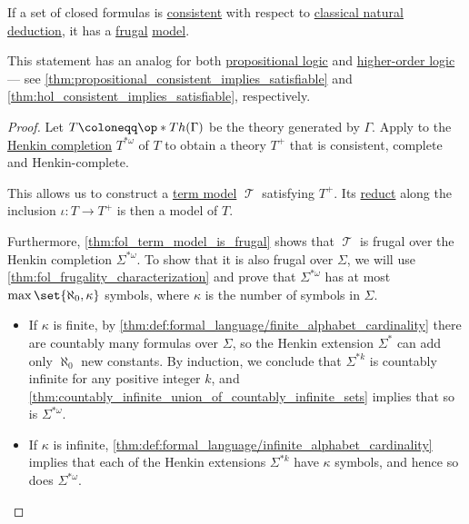 \begin{corollary}\label{thm:fol_consistent_implies_satisfiable}
  If a set of closed formulas is \hyperref[def:fol_theory/consistent]{consistent} with respect to \hyperref[def:fol_natural_deduction_system]{classical natural deduction}, it has a \hyperref[def:fol_frugal_structure]{frugal} \hyperref[def:fol_semantics/model]{model}.
\end{corollary}
\begin{comments}
  \item This statement has an analog for both \hyperref[def:propositional_logic]{propositional logic} and \hyperref[def:higher_order_logic]{higher-order logic} --- see \cref{thm:propositional_consistent_implies_satisfiable} and \cref{thm:hol_consistent_implies_satisfiable}, respectively.
\end{comments}
\begin{proof}
  Let \( T \coloneqq \op*{Th}(\Gamma) \) be the theory generated by \( \Gamma \). Apply  to the \hyperref[def:fol_henkin_completion]{Henkin completion} \( T^{*\omega} \) of \( T \) to obtain a theory \( T^+ \) that is consistent, complete and Henkin-complete.

  This allows us to construct a \hyperref[def:fol_term_model]{term model} \( \mscrT \) satisfying \( T^+ \). Its \hyperref[def:fol_reduct_along_morphism]{reduct} along the inclusion \( \iota: T \to T^+ \) is then a model of \( T \).

  Furthermore, \cref{thm:fol_term_model_is_frugal} shows that \( \mscrT \) is frugal over the Henkin completion \( \Sigma^{*\omega} \). To show that it is also frugal over \( \Sigma \), we will use \cref{thm:fol_frugality_characterization} and prove that \( \Sigma^{*\omega} \) has at most \( \max\set{ \aleph_0, \kappa } \) symbols, where \( \kappa \) is the number of symbols in \( \Sigma \).

  \begin{itemize}
    \item If \( \kappa \) is finite, by \cref{thm:def:formal_language/finite_alphabet_cardinality} there are countably many formulas over \( \Sigma \), so the Henkin extension \( \Sigma^* \) can add only \( \aleph_0 \) new constants. By induction, we conclude that \( \Sigma^{*k} \) is countably infinite for any positive integer \( k \), and \cref{thm:countably_infinite_union_of_countably_infinite_sets} implies that so is \( \Sigma^{*\omega} \).

    \item If \( \kappa \) is infinite, \cref{thm:def:formal_language/infinite_alphabet_cardinality} implies that each of the Henkin extensions \( \Sigma^{*k} \) have \( \kappa \) symbols, and hence so does \( \Sigma^{*\omega} \).
  \end{itemize}
\end{proof}

